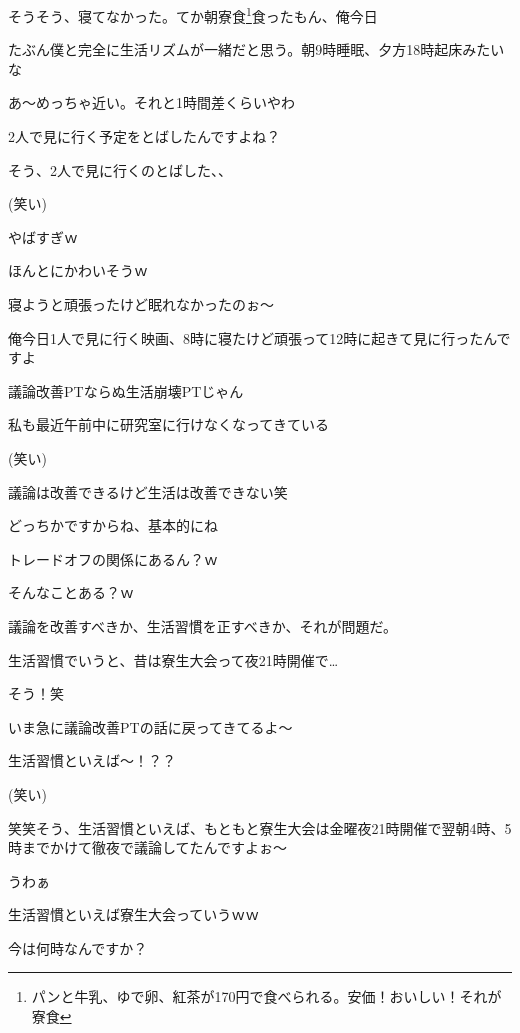 \begin{multicols}{2}
そうそう、寝てなかった。てか朝寮食\footnote{パンと牛乳、ゆで卵、紅茶が170円で食べられる。安価！おいしい！それが寮食}食ったもん、俺今日

たぶん僕と完全に生活リズムが一緒だと思う。朝9時睡眠、夕方18時起床みたいな

あ〜めっちゃ近い。それと1時間差くらいやわ

2人で見に行く予定をとばしたんですよね？

そう、2人で見に行くのとばした、、

(笑い)

やばすぎｗ

ほんとにかわいそうｗ

寝ようと頑張ったけど眠れなかったのぉ〜

俺今日1人で見に行く映画、8時に寝たけど頑張って12時に起きて見に行ったんですよ

議論改善PTならぬ生活崩壊PTじゃん

私も最近午前中に研究室に行けなくなってきている

(笑い)

議論は改善できるけど生活は改善できない笑

どっちかですからね、基本的にね

トレードオフの関係にあるん？ｗ

そんなことある？ｗ

議論を改善すべきか、生活習慣を正すべきか、それが問題だ。

生活習慣でいうと、昔は寮生大会って夜21時開催で…

そう！笑

いま急に議論改善PTの話に戻ってきてるよ〜

生活習慣といえば〜！？？

(笑い)

笑笑そう、生活習慣といえば、もともと寮生大会は金曜夜21時開催で翌朝4時、5時までかけて徹夜で議論してたんですよぉ〜

うわぁ

生活習慣といえば寮生大会っていうｗｗ

今は何時なんですか？


\end{multicols}

